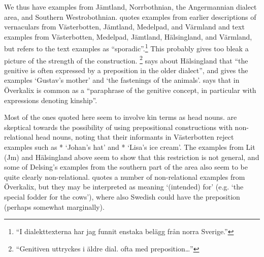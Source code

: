 \z 
\z

We thus have examples from Jämtland, Norrbothnian, the Angermannian dialect area, and Southern Westrobothnian. \citet[44]{Delsing2003a} quotes examples from earlier descriptions of vernaculars from Västerbotten, Jämtland, Medelpad, and Värmland and text examples from Västerbotten, Medelpad, Jämtland, Hälsingland, and Värmland, but refers to the text examples as “sporadic”.\footnote{ “I dialekttexterna har jag funnit enstaka belägg från norra Sverige.” } This probably gives too bleak a picture of the strength of the construction. \citet[61]{Hedblom1978}\footnote{ “Genitiven uttryckes i äldre dial. ofta med preposition…” } says about Hälsingland that “the genitive is often expressed by a preposition in the older dialect”, and gives the examples  ‘Gustav’s mother’ and ‘the fastenings of the animals’. \citet[157]{Källskog1992} says that in Överkalix  is common as a “paraphrase of the genitive concept, in particular with expressions denoting kinship”. 

Most of the ones quoted here seem to involve kin terms as head nouns. \citet{BergholmEtAl1999} are skeptical towards the possibility of using prepositional constructions with non-relational head nouns, noting that their informants in Västerbotten reject examples such as * ‘Johan’s hat’ and * ‘Lisa’s ice cream’. The examples from Lit (Jm) and Hälsingland above seem to show that this restriction is not general, and some of Delsing’s examples from the southern part of the area also seem to be quite clearly non-relational. \citet[157]{Källskog1992} quotes a number of non-relational examples from Överkalix, but they may be interpreted as meaning ‘(intended) for’ (e.g.  ‘the special fodder for the cows’), where also Swedish could have the preposition  (perhaps somewhat marginally). 

